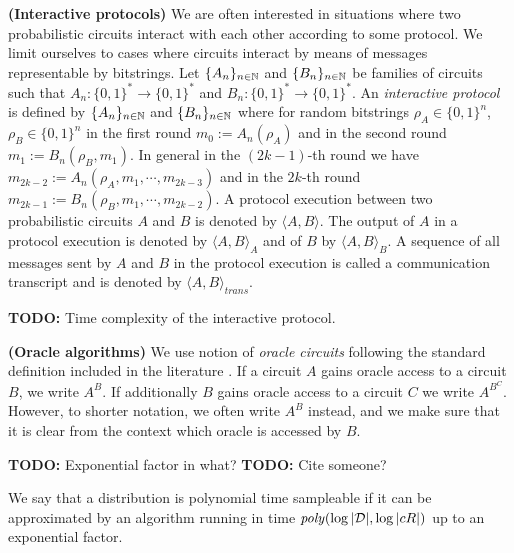 \textbf{(Interactive protocols)}
We are often interested in situations where two probabilistic circuits interact with each other according to some protocol.
We limit ourselves to cases where circuits interact by means of messages representable by bitstrings.
Let $\{A_n\}_{n \in \mathbb{N}}$ and $\{B_n\}_{n \in \mathbb{N}}$ be families of circuits such that $A_n : \{0,1\}^{*} \rightarrow \{0,1\}^{*}$ and $B_n : \{0,1\}^{*} \rightarrow \{0,1\}^{*}$.
An \textit{interactive protocol} is defined by $\{A_n\}_{n \in \mathbb{N}}$ and $\{B_n\}_{n \in \mathbb{N}}$ where
for random bitstrings $\rho_A \in \{0,1\}^{n}$, $\rho_B \in \{0,1\}^{n}$ in the first round $m_0 := A_n(\rho_A)$ and in the second round $m_1 := B_n(\rho_B, m_1)$.
In general in the $(2k\!-\!1)$-th round we have $m_{2k-2} := A_n(\rho_A, m_1, \cdots, m_{2k-3})$ and in the $2k$-th round $m_{2k-1} := B_n(\rho_B, m_1, \cdots, m_{2k-2})$.
A protocol execution between two probabilistic circuits $A$ and $B$ is denoted by $\langle A, B \rangle$.
The output of $A$ in a protocol execution is denoted by $\langle A, B \rangle_A$ and of $B$ by $\langle A, B \rangle_B$.
A sequence of all messages sent by $A$ and $B$ in the protocol execution is called a communication transcript and
is denoted by $\langle A, B \rangle_{\mathit{trans}}$.

\begin{todo}
  \textbf{TODO:} Time complexity of the interactive protocol.
\end{todo}

\textbf{(Oracle algorithms)}
We use notion of \textit{oracle circuits} following the standard definition included in the literature \cite{Goldreich:2004:FCV:975541}.
If a circuit $A$ gains oracle access to a circuit $B$, we write $A^{B}$. If additionally $B$ gains oracle access to a circuit $C$
we write $A^{B^C}$. However, to shorter notation, we often write $A^{B}$ instead, and
we make sure that it is clear from the context which oracle is accessed by $B$.

\begin{todo}
  \textbf{TODO:} Exponential factor in what?
  \textbf{TODO:} Cite someone?
\end{todo}
\begin{definition}
We say that a distribution is \textnormal{polynomial time sampleable} if it can be approximated by an algorithm running in time $\mathit{poly}(\log|\mathcal{D}|, \log|cR|)$
up to an exponential factor.
\end{definition}

